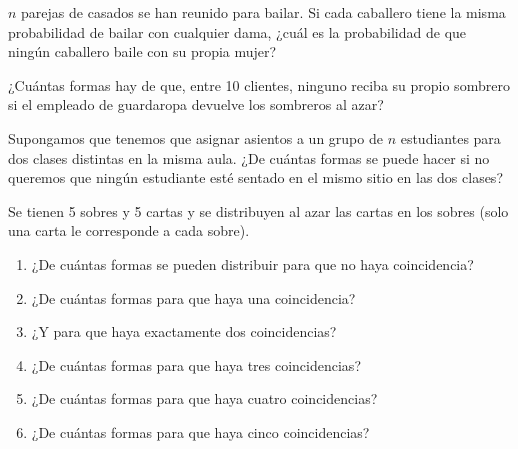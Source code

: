 \begin{ejercicio}
    $n$ parejas de casados se han reunido para bailar. Si cada caballero tiene la misma probabilidad de bailar con cualquier dama, ¿cuál es la probabilidad de que ningún caballero baile con su propia mujer?
\end{ejercicio}

\begin{ejercicio}
    ¿Cuántas formas hay de que, entre 10 clientes, ninguno reciba su propio sombrero si el empleado de guardaropa devuelve los sombreros al azar?
\end{ejercicio}

\begin{ejercicio}
    Supongamos que tenemos que asignar asientos a un grupo de $n$ estudiantes para dos clases distintas en la misma aula. ¿De cuántas formas se puede hacer si no queremos que ningún estudiante esté sentado en el mismo sitio en las dos clases?
\end{ejercicio}

\begin{ejercicio}
    Se tienen 5 sobres y 5 cartas y se distribuyen al azar las cartas en los sobres (solo una carta le corresponde a cada sobre).

    \renewcommand{\labelenumi}{\alph{enumi})}
    \begin{enumerate}
        \item ¿De cuántas formas se pueden distribuir para que no haya coincidencia?
        \item ¿De cuántas formas para que haya una coincidencia?
        \item ¿Y para que haya exactamente dos coincidencias?
        \item ¿De cuántas formas para que haya tres coincidencias?
        \item ¿De cuántas formas para que haya cuatro coincidencias?
        \item ¿De cuántas formas para que haya cinco coincidencias?
    \end{enumerate}
\end{ejercicio}